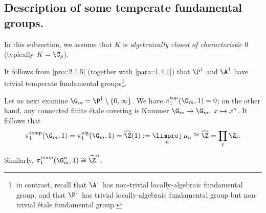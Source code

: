\subsection{Description of some temperate fundamental groups.}\label{sub::2.3}

 In this subsection, we assume that $K$ is {\it
 algebraically closed of characteristic $0$} (typically $K=\C_p$).

\begin{para}\label{para::2.3.1} It follows from \ref{pro::2.1.5}
 (together with \ref{para::1.4.1}) 
 that $\P^1$ and $\A^1$ have trivial temperate fundamental
 groups\footnote{in contrast, recall that $\A^1$ has non-trivial
 locally-algebraic fundamental group, and that $\P^1$ has trivial
 locally-algebraic fundamental group but non-trivial \'etale fundamental
 group.}.

Let us next examine $\G_m=\P^1\setminus\{0,\infty\}$. We have
$\pi_1^{\mathrm{top}}(\G_m,1)=0$; on the other hand, any connected finite
\'etale covering is Kummer $\G_m\to \G_m,\; x\mapsto x^n$. It follows that
\begin{equation*}
\pi_1^{\mathrm{temp}}(\G_m,1)=\pi_1^{\mathrm{alg}}(\G_m,1)=\widehat{\Z}(1):=
 \underset{n}{\limproj}\,\mu_n \cong \widehat{\Z}=\prod_\ell \Z_\ell.
\end{equation*}

\noindent Similarly, $\displaystyle\pi_1^{\mathrm{temp}}(\G_m^n,1)\cong
 \widehat{\Z}^n$. 
\end{para}

